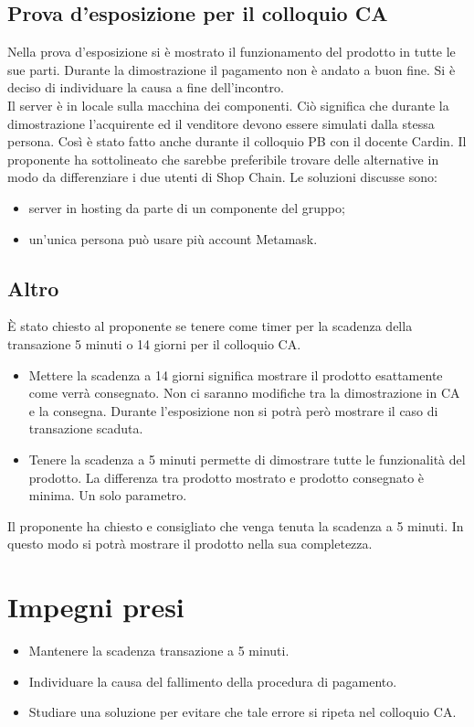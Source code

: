\documentclass[a4paper, 12pt]{article}
\begin{document}
\subsection{Prova d'esposizione per il colloquio CA}
Nella prova d'esposizione si è mostrato il funzionamento del prodotto in tutte le sue parti. Durante la dimostrazione il pagamento non è andato a buon fine. Si è deciso di individuare la causa a fine dell'incontro.
\\Il server è in locale sulla macchina dei componenti. Ciò significa che durante la dimostrazione l'acquirente ed il venditore devono essere simulati dalla stessa persona. Così è stato fatto anche durante il colloquio PB con il docente Cardin. Il proponente ha sottolineato che sarebbe preferibile trovare delle alternative in modo da differenziare i due utenti di Shop Chain. Le soluzioni discusse sono: 
\begin{itemize}
	\item server in hosting da parte di un componente del gruppo;
	\item un'unica persona può usare più account Metamask.
\end{itemize}

\subsection{Altro}
È stato chiesto al proponente se tenere come timer per la scadenza della transazione 5 minuti o 14 giorni per il colloquio CA.
\begin{itemize}
	\item Mettere la scadenza a 14 giorni significa mostrare il prodotto esattamente come verrà consegnato. Non ci saranno modifiche tra la dimostrazione in CA e la consegna. Durante l'esposizione non si potrà però mostrare il caso di transazione scaduta.
	\item Tenere la scadenza a 5 minuti permette di dimostrare tutte le funzionalità del prodotto. La differenza tra prodotto mostrato e prodotto consegnato è minima. Un solo parametro.
\end{itemize}
Il proponente ha chiesto e consigliato che venga tenuta la scadenza a 5 minuti. In questo modo si potrà mostrare il prodotto nella sua completezza.

\section{Impegni presi}
\begin{itemize}
\item Mantenere la scadenza transazione a 5 minuti.
\item Individuare la causa del fallimento della procedura di pagamento.
\item Studiare una soluzione per evitare che tale errore si ripeta nel colloquio CA.
\end{itemize}
\end{document}
